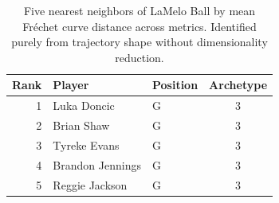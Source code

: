 \begin{table}[htbp]
  \centering\small
  \begin{tabular}{rllc}
    \toprule
    Rank & Player & Position & Archetype \\
    \midrule
    1 & Luka Doncic & G & 3 \\
    2 & Brian Shaw & G & 3 \\
    3 & Tyreke Evans & G & 3 \\
    4 & Brandon Jennings & G & 3 \\
    5 & Reggie Jackson & G & 3 \\
    \bottomrule
  \end{tabular}
  \caption{Five nearest neighbors of LaMelo Ball by mean Fr\'{e}chet curve distance across metrics. Identified purely from trajectory shape without dimensionality reduction.}
  \label{tab:LaMelo_Ball_frechet_curve_neighbors}
\end{table}

